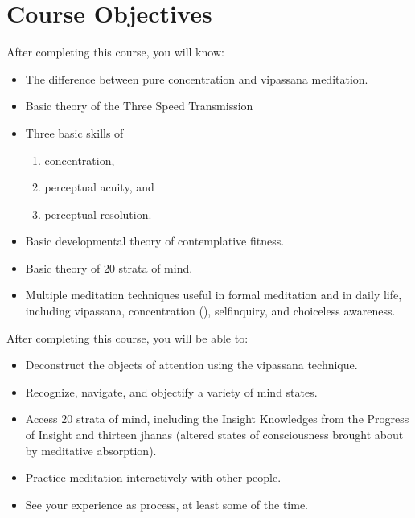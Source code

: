 \documentclass[a5paper,10pt,english]{book}
\begin{document}
\section{Course Objectives}
\label{\detokenize{main-3:course-objectives}}
\sphinxAtStartPar
After completing this course, you will know:
\begin{itemize}
\item {} 
\sphinxAtStartPar
The difference between pure concentration and vipassana meditation.

\item {} 
\sphinxAtStartPar
Basic theory of the Three Speed Transmission

\item {} 
\sphinxAtStartPar
Three basic skills of
\begin{enumerate}
%
\item {} 
\sphinxAtStartPar
concentration,

\item {} 
\sphinxAtStartPar
perceptual acuity, and

\item {} 
\sphinxAtStartPar
perceptual resolution.

\end{enumerate}

\item {} 
\sphinxAtStartPar
Basic developmental theory of contemplative fitness.

\item {} 
\sphinxAtStartPar
Basic theory of 20 strata of mind.

\item {} 
\sphinxAtStartPar
Multiple meditation techniques useful in formal meditation and in daily life, including vipassana, concentration (), self\sphinxhyphen{}inquiry, and choiceless awareness.

\end{itemize}

\sphinxAtStartPar
After completing this course, you will be able to:
\begin{itemize}
\item {} 
\sphinxAtStartPar
Deconstruct the objects of attention using the vipassana technique.

\item {} 
\sphinxAtStartPar
Recognize, navigate, and objectify a variety of mind states.

\item {} 
\sphinxAtStartPar
Access 20 strata of mind, including the Insight Knowledges from the Progress of Insight and thirteen jhanas (altered states of consciousness brought about by meditative absorption).

\item {} 
\sphinxAtStartPar
Practice meditation interactively with other people.

\item {} 
\sphinxAtStartPar
See your experience as process, at least some of the time.

\end{itemize}
\end{document}
